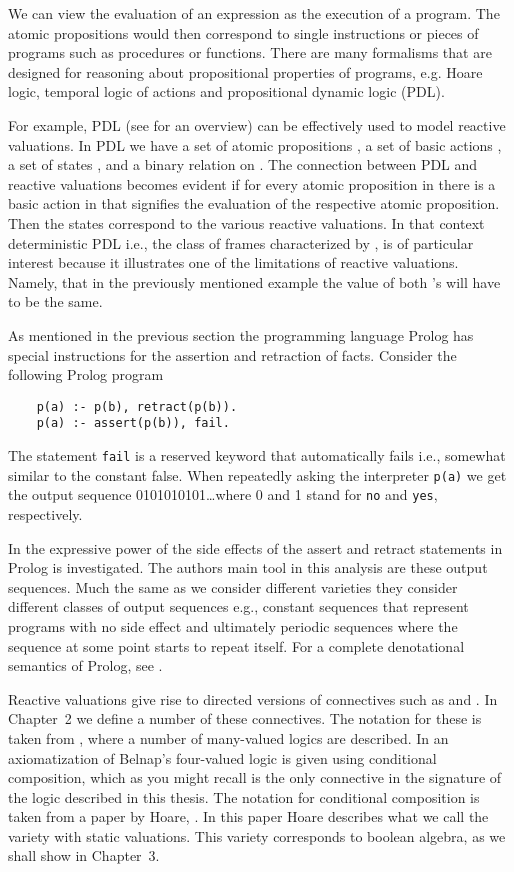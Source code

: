 \documentclass[a4paper,twoside,openright]{report}
\begin{document}
We can view the evaluation of an expression as the execution of a program. The atomic propositions would then correspond to single instructions or pieces of programs such as procedures or functions. There are many formalisms that are designed for reasoning about propositional properties of programs, e.g. Hoare logic, temporal logic of actions and propositional dynamic logic (PDL). 

For example, PDL (see \cite{PDL} for an overview) can be effectively used to model reactive valuations. In PDL we have a set of atomic propositions , a set of basic actions , a set of states , and a binary relation  on . The connection between PDL and reactive valuations becomes evident if for every atomic proposition in  there is a basic action in  that signifies the evaluation of the respective atomic proposition. Then the states  correspond to the various reactive valuations. In that context deterministic PDL i.e., the class of frames characterized by , is of particular interest because it illustrates one of the limitations of reactive valuations. Namely, that in the previously mentioned example  the value of both 's will have to be the same.

As mentioned in the previous section the programming language Prolog has special instructions for the assertion and retraction of facts.  Consider the following Prolog program
\begin{verbatim}
    p(a) :- p(b), retract(p(b)).
    p(a) :- assert(p(b)), fail.
\end{verbatim}
The statement \verb|fail| is a reserved keyword that automatically fails i.e., somewhat similar to the constant false. When repeatedly asking the interpreter \verb|p(a)| we get the output sequence 0101010101\ldots where 0 and 1 stand for \verb|no| and \verb|yes|, respectively.

In \cite{prolog_expr} the expressive power of the side effects of the assert and retract statements in Prolog is investigated. The authors main tool in this analysis are these output sequences. Much the same as we consider different varieties they consider different classes of output sequences e.g., constant sequences that represent programs with no side effect and ultimately periodic sequences where the sequence at some point starts to repeat itself. For a complete denotational semantics of Prolog, see \cite{prolog_semantics}.

Reactive valuations give rise to directed versions of connectives such as  and . In Chapter~2 we define a number of these connectives. The notation for these is taken from \cite{connectives}, where a number of many-valued logics are described. In \cite{belnap_cond} an axiomatization of Belnap's four-valued logic is given using conditional composition, which as you might recall is the only connective in the signature of the logic described in this thesis. The notation for conditional composition is taken from a paper by Hoare, \cite{hoare}. In this paper Hoare describes what we call the variety with static valuations. This variety corresponds to boolean algebra, as we shall show in Chapter~3.
\end{document}
